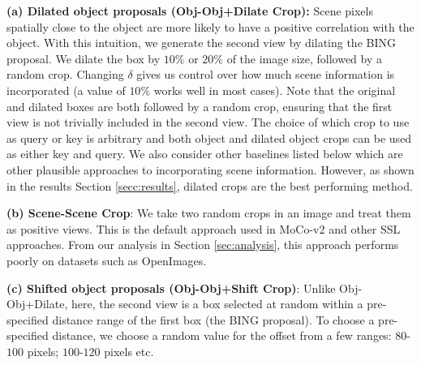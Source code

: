 


\textbf{(a) Dilated object proposals (Obj-Obj+Dilate Crop):} 
Scene pixels spatially close to the object are more likely to have a positive correlation with the object. With this intuition, we generate the second view by dilating the BING proposal. We dilate the box by $10\%$ or $20\%$ of the image size, followed by a random crop. Changing $\delta$ gives us control over how much scene information is incorporated (a value of $10\%$ works well in most cases). Note that the original and dilated boxes are both followed by a random crop, ensuring that the first view is not trivially included in the second view. The choice of which crop to use as query or key is arbitrary and both object and dilated object crops can be used as either key and query.  We also consider other baselines listed below which are other plausible approaches to incorporating scene information. However, as shown in the results Section \ref{secc:results}, dilated crops are the best performing method. 

\textbf{(b) Scene-Scene Crop}: We take two random crops in an image and treat them as positive views. This is the default approach used in MoCo-v2 and other SSL approaches. From our analysis in Section \ref{sec:analysis}, this approach performs poorly on datasets such as OpenImages. 

\textbf{(c) Shifted object proposals (Obj-Obj+Shift Crop)}: Unlike Obj-Obj+Dilate, here, the second view is a box selected at random within a pre-specified distance range of the first box (the BING proposal). To choose a pre-specified distance, we choose a random value for the offset from a few ranges: $80$-$100$ pixels; $100$-$120$ pixels etc. 

